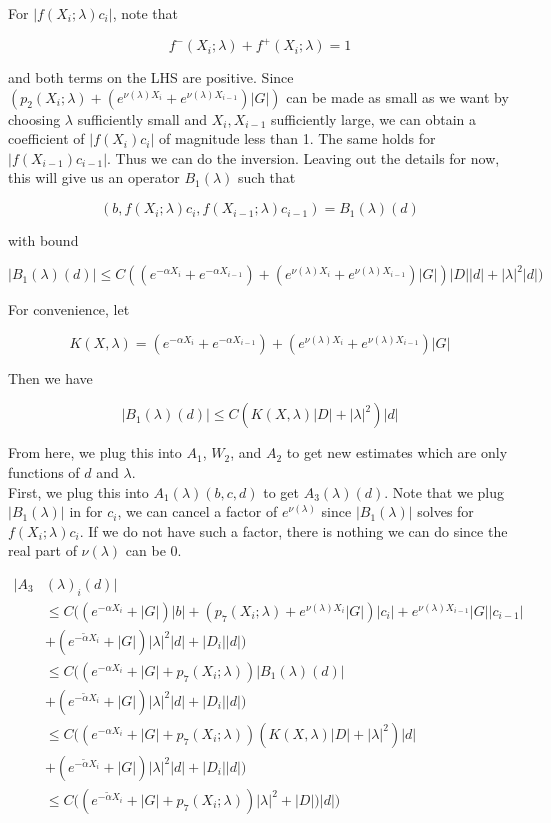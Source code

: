 \documentclass[12pt]{article}
\begin{document}
\begin{enumerate}
For $|f(X_i; \lambda) c_i|$, note that 

\[
f^-(X_i; \lambda) + f^+(X_i; \lambda) = 1
\]

and both terms on the LHS are positive. Since $(p_2(X_i; \lambda) + (e^{\nu(\lambda)X_i} + e^{\nu(\lambda)X_{i-1}})|G|)$ can be made as small as we want by choosing $\lambda$ sufficiently small and $X_i, X_{i-1}$ sufficiently large, we can obtain a coefficient of $|f(X_i)c_i|$ of magnitude less than 1. The same holds for $|f(X_{i-1})c_{i-1}|$. Thus we can do the inversion. Leaving out the details for now, this will give us an operator $B_1(\lambda)$ such that

\[
(b, f(X_i; \lambda) c_i, f(X_{i-1}; \lambda) c_{i-1} ) = B_1(\lambda)(d)
\]

with bound

\[
|B_1(\lambda)(d)| \leq C( (e^{-\alpha X_i} + e^{-\alpha X_{i-1}}) + (e^{\nu(\lambda)X_i} + e^{\nu(\lambda)X_{i-1}}) |G|) |D||d| + |\lambda|^2 |d|)
\]

For convenience, let

\[
K(X, \lambda) = (e^{-\alpha X_i} + e^{-\alpha X_{i-1}}) + (e^{\nu(\lambda)X_i} + e^{\nu(\lambda)X_{i-1}})|G|
\]

Then we have

\[
|B_1(\lambda)(d)| \leq C( K(X, \lambda) |D|+ |\lambda|^2 )|d|
\]


From here, we plug this into $A_1$, $W_2$, and $A_2$ to get new estimates which are only functions of $d$ and $\lambda$.\\

First, we plug this into $A_1(\lambda)(b, c, d)$ to get $A_3(\lambda)(d)$. Note that we plug $|B_1(\lambda)|$ in for $c_i$, we can cancel a factor of $e^{\nu(\lambda)}$ since $|B_1(\lambda)|$ solves for $f(X_i; \lambda) c_i$. If we do not have such a factor, there is nothing we can do since the real part of $\nu(\lambda)$ can be 0.

\begin{align*}
|A_3&(\lambda)_i(d)| \\
&\leq C \Big( (e^{-\alpha X_i} + |G|) |b|
+ ( p_7(X_i; \lambda) + e^{\nu(\lambda)X_i} |G|) |c_i| + e^{\nu(\lambda)X_{i-1}} |G| |c_{i-1}| \\
&+ (e^{-\tilde{\alpha} X_i} + |G|) |\lambda|^2 |d| + |D_i||d| \Big) \\
&\leq C \Big( (e^{-\alpha X_i} + |G| + p_7(X_i; \lambda) )|B_1(\lambda)(d)|\\
&+ (e^{-\tilde{\alpha} X_i} + |G|) |\lambda|^2 |d| + |D_i||d| \Big) \\
&\leq C \Big( (e^{-\alpha X_i} + |G| + p_7(X_i; \lambda) )( K(X, \lambda) |D|+ |\lambda|^2 )|d|\\
&+ (e^{-\tilde{\alpha} X_i} + |G|) |\lambda|^2 |d| + |D_i||d| \Big) \\
&\leq C \Big( (e^{-\tilde{\alpha} X_i} + |G| + p_7(X_i; \lambda) ) |\lambda|^2  + |D|)|d| \Big) \\
\end{align*}


\end{enumerate}
\end{document}
